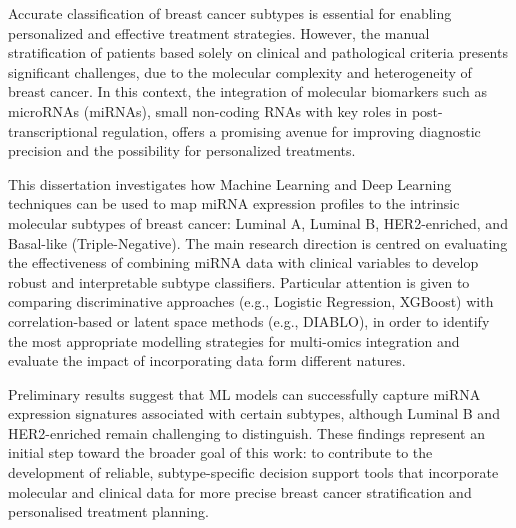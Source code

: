 
%

Accurate classification of breast cancer subtypes is essential for enabling
personalized and effective treatment strategies. However, the manual
stratification of patients based solely on clinical and pathological criteria
presents significant challenges, due to the molecular complexity and
heterogeneity of breast cancer. In this context, the integration of molecular
biomarkers such as microRNAs (miRNAs), small non-coding RNAs with key roles in
post-transcriptional regulation, offers a promising avenue for improving
diagnostic precision and the possibility for personalized treatments.

This dissertation investigates how Machine Learning and Deep Learning
techniques can be used to map miRNA expression profiles to the intrinsic
molecular subtypes of breast cancer: Luminal A, Luminal B, HER2-enriched, and
Basal-like (Triple-Negative). The main research direction is centred on
evaluating the effectiveness of combining miRNA data with clinical variables to
develop robust and interpretable subtype classifiers. Particular attention is
given to comparing discriminative approaches (e.g., Logistic Regression,
XGBoost) with correlation-based or latent space methods (e.g., DIABLO), in
order to identify the most appropriate modelling strategies for multi-omics
integration and evaluate the impact of incorporating data form different
natures.

Preliminary results suggest that ML models can successfully capture miRNA
expression signatures associated with certain subtypes, although Luminal B and
HER2-enriched remain challenging to distinguish. These findings represent an
initial step toward the broader goal of this work: to contribute to the
development of reliable, subtype-specific decision support tools that
incorporate molecular and clinical data for more precise breast cancer
stratification and personalised treatment planning.

